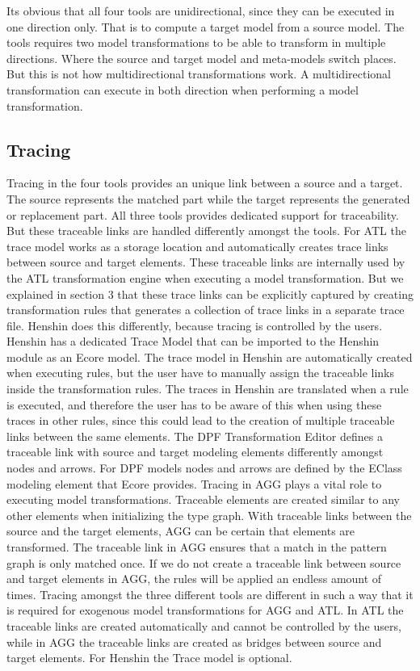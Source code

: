 Its obvious that all four tools are unidirectional, since they can be
executed in one direction only. That is to compute a target model from a
source model. The tools requires two model transformations to be able to
transform in multiple directions. Where the source and target model and
meta-models switch places. But this is not how multidirectional transformations
work. A multidirectional transformation can execute in both direction when
performing a model transformation.

\subsection{Tracing}

Tracing in the four tools provides an unique link between a source and a target.
The source represents the matched part while the target represents the
generated or replacement part. All three tools provides dedicated support for
traceability. But these traceable links are handled differently amongst the
tools. For ATL the trace model works as a storage location and automatically
creates trace links between source and target elements. These traceable links
are internally used by the ATL transformation engine when executing a model
transformation. But we explained in section 3 that these trace links can be
explicitly captured by creating transformation rules that generates a
collection of trace links in a separate trace file. Henshin does this
differently, because tracing is controlled by the users. Henshin has a
dedicated Trace Model that can be imported to the Henshin module as an Ecore
model. The trace model in Henshin are automatically created when executing
rules, but the user have to manually assign the traceable links inside the
transformation rules. The traces in Henshin are translated when a rule is
executed, and therefore the user has to be aware of this when using these
traces in other rules, since this could lead to the creation of multiple
traceable links between the same elements. The DPF Transformation Editor defines
a traceable link with source and target modeling elements differently amongst
nodes and arrows. For DPF models nodes and arrows are defined by the EClass
modeling element that Ecore provides. Tracing in AGG plays a vital role to
executing model transformations. Traceable elements are created similar to any
other elements when initializing the type graph. With traceable links between
the source and the target elements, AGG can be certain that elements are
transformed. The traceable link in AGG ensures that a match in the pattern
graph is only matched once. If we do not create a traceable link between source
and target elements in AGG, the rules will be applied an endless amount of
times. Tracing amongst the three different tools are different in such a way
that it is required for exogenous model transformations for AGG and ATL. In ATL
the traceable links are created automatically and cannot be controlled by the
users, while in AGG the traceable links are created as bridges between source
and target elements. For Henshin the Trace model is optional.

